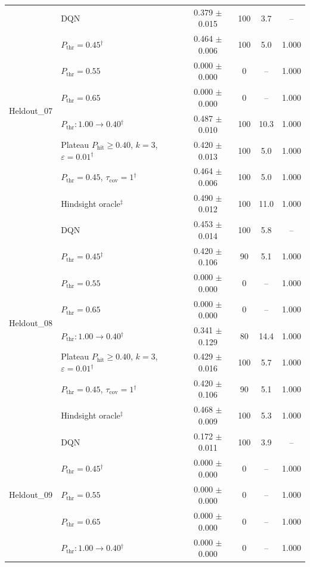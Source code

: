 \begin{table}[htbp]
\begin{tabular}{llcccc}
\midrule
\multirow{8}{*}{Heldout\_07} & DQN & 0.379 $\pm$ 0.015 & 100 & 3.7 & -- \\
 & $P_{\mathrm{thr}}=0.45$$^{\dagger}$ & 0.464 $\pm$ 0.006 & 100 & 5.0 & 1.000 \\
 & $P_{\mathrm{thr}}=0.55$ & 0.000 $\pm$ 0.000 & 0 & -- & 1.000 \\
 & $P_{\mathrm{thr}}=0.65$ & 0.000 $\pm$ 0.000 & 0 & -- & 1.000 \\
 & $P_{\mathrm{thr}}: 1.00 \to 0.40$$^{\dagger}$ & 0.487 $\pm$ 0.010 & 100 & 10.3 & 1.000 \\
 & Plateau $P_{\mathrm{hit}}\geq0.40$, $k=3$, $\varepsilon=0.01$$^{\dagger}$ & 0.420 $\pm$ 0.013 & 100 & 5.0 & 1.000 \\
 & $P_{\mathrm{thr}}=0.45$, $\tau_{\mathrm{cov}}=1$$^{\dagger}$ & 0.464 $\pm$ 0.006 & 100 & 5.0 & 1.000 \\
 & Hindsight oracle$^{\ddagger}$ & 0.490 $\pm$ 0.012 & 100 & 11.0 & 1.000 \\
\midrule
\multirow{8}{*}{Heldout\_08} & DQN & 0.453 $\pm$ 0.014 & 100 & 5.8 & -- \\
 & $P_{\mathrm{thr}}=0.45$$^{\dagger}$ & 0.420 $\pm$ 0.106 & 90 & 5.1 & 1.000 \\
 & $P_{\mathrm{thr}}=0.55$ & 0.000 $\pm$ 0.000 & 0 & -- & 1.000 \\
 & $P_{\mathrm{thr}}=0.65$ & 0.000 $\pm$ 0.000 & 0 & -- & 1.000 \\
 & $P_{\mathrm{thr}}: 1.00 \to 0.40$$^{\dagger}$ & 0.341 $\pm$ 0.129 & 80 & 14.4 & 1.000 \\
 & Plateau $P_{\mathrm{hit}}\geq0.40$, $k=3$, $\varepsilon=0.01$$^{\dagger}$ & 0.429 $\pm$ 0.016 & 100 & 5.7 & 1.000 \\
 & $P_{\mathrm{thr}}=0.45$, $\tau_{\mathrm{cov}}=1$$^{\dagger}$ & 0.420 $\pm$ 0.106 & 90 & 5.1 & 1.000 \\
 & Hindsight oracle$^{\ddagger}$ & 0.468 $\pm$ 0.009 & 100 & 5.3 & 1.000 \\
\midrule
\multirow{8}{*}{Heldout\_09} & DQN & 0.172 $\pm$ 0.011 & 100 & 3.9 & -- \\
 & $P_{\mathrm{thr}}=0.45$$^{\dagger}$ & 0.000 $\pm$ 0.000 & 0 & -- & 1.000 \\
 & $P_{\mathrm{thr}}=0.55$ & 0.000 $\pm$ 0.000 & 0 & -- & 1.000 \\
 & $P_{\mathrm{thr}}=0.65$ & 0.000 $\pm$ 0.000 & 0 & -- & 1.000 \\
 & $P_{\mathrm{thr}}: 1.00 \to 0.40$$^{\dagger}$ & 0.000 $\pm$ 0.000 & 0 & -- & 1.000 \\

\end{tabular}
\end{table}
